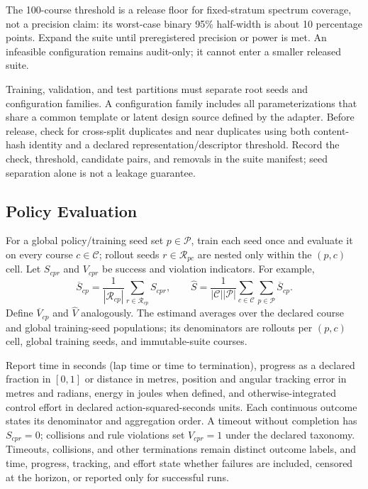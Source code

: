 The 100-course threshold is a release floor for fixed-stratum spectrum coverage, not
a precision claim: its worst-case binary 95\% half-width is about 10 percentage
points. Expand the suite until preregistered precision or power is met. An infeasible
configuration remains audit-only; it cannot enter a smaller released suite.

Training, validation, and test partitions must separate root seeds and configuration
families. A configuration family includes all parameterizations that share a common
template or latent design source defined by the adapter. Before release, check for
cross-split duplicates and near duplicates using both content-hash identity and a
declared representation/descriptor threshold. Record the check, threshold, candidate
pairs, and removals in the suite manifest; seed separation alone is not a leakage
guarantee.

\subsection{Policy Evaluation}

For a global policy/training seed set $p\in\mathcal{P}$, train each seed once and
evaluate it on every course $c\in\mathcal{C}$; rollout seeds
$r\in\mathcal{R}_{pc}$ are nested only within the $(p,c)$ cell. Let $S_{cpr}$ and
$V_{cpr}$ be success and violation indicators. For example,
\begin{equation}
  \overline{S}_{cp}=\frac{1}{|\mathcal{R}_{cp}|}\sum_{r\in\mathcal{R}_{cp}}S_{cpr},
  \qquad \widehat{S}=\frac{1}{|\mathcal{C}||\mathcal{P}|}
  \sum_{c\in\mathcal{C}}\sum_{p\in\mathcal{P}}\overline{S}_{cp}.
  \label{eq:policy-success-estimator}
\end{equation}
Define $\overline{V}_{cp}$ and $\widehat{V}$ analogously. The estimand averages over
the declared course and global training-seed populations; its denominators are
rollouts per $(p,c)$ cell, global training seeds, and immutable-suite courses.

Report time in seconds (lap time or time to termination), progress as a declared
fraction in $[0,1]$ or distance in metres, position and angular tracking error in
metres and radians, energy in joules when defined, and otherwise-integrated control
effort in declared action-squared-seconds units. Each continuous outcome states its
denominator and aggregation order. A timeout without completion has $S_{cpr}=0$;
collisions and rule violations set $V_{cpr}=1$ under the declared taxonomy. Timeouts,
collisions, and other terminations remain distinct outcome labels, and time, progress,
tracking, and effort state whether failures are included, censored at the horizon, or
reported only for successful runs.

